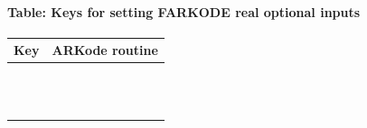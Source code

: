 \documentclass[letterpaper,10pt,english]{sphinxmanual}
\begin{document}
\paragraph{Table: Keys for setting FARKODE real optional inputs}
\label{f_interface/Usage:finterface-rinoptiontable}\label{f_interface/Usage:table-keys-for-setting-farkode-real-optional-inputs}
\begin{tabulary}{\linewidth}{|L|L|}
\hline
\textsf{\relax 
Key
} & \textsf{\relax 
ARKode routine
}\\
\hline
{}
 & 
{\hyperref[c_interface/User_callable:c.ARKodeSetInitStep]{\emph{}}}
\\
\hline
{}
 & 
{\hyperref[c_interface/User_callable:c.ARKodeSetMaxStep]{\emph{}}}
\\
\hline
{}
 & 
{\hyperref[c_interface/User_callable:c.ARKodeSetMinStep]{\emph{}}}
\\
\hline
{}
 & 
{\hyperref[c_interface/User_callable:c.ARKodeSetStopTime]{\emph{}}}
\\
\hline
{}
 & 
{\hyperref[c_interface/User_callable:c.ARKodeSetNonlinConvCoef]{\emph{}}}
\\
\hline
{}
 & 
{\hyperref[c_interface/User_callable:c.ARKodeSetCFLFraction]{\emph{}}}
\\
\hline
{}
 & 
{\hyperref[c_interface/User_callable:c.ARKodeSetSafetyFactor]{\emph{}}}
\\
\hline
{}
 & 
{\hyperref[c_interface/User_callable:c.ARKodeSetErrorBias]{\emph{}}}
\\
\hline
{}
 & 
{\hyperref[c_interface/User_callable:c.ARKodeSetMaxGrowth]{\emph{}}}
\\
\hline
{}
 & 
{\hyperref[c_interface/User_callable:c.ARKodeSetMaxFirstGrowth]{\emph{}}}
\\
\hline
{}
 & 
{\hyperref[c_interface/User_callable:c.ARKodeSetFixedStepBounds]{\emph{}}}
\\
\hline
{}
 & 
{\hyperref[c_interface/User_callable:c.ARKodeSetMaxEFailGrowth]{\emph{}}}
\\

\end{tabulary}
\end{document}
